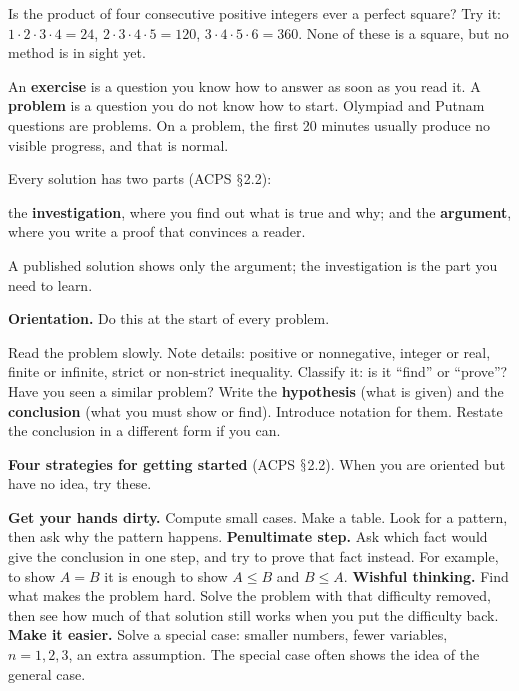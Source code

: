 \documentclass[10pt]{scrartcl}
\renewcommand{\S}{\ensuremath{\mathsection}}
\begin{document}
\begin{qbox}
  Is the product of four consecutive positive integers ever a perfect square? Try it: $1\cdot2\cdot3\cdot4 = 24$, $2\cdot3\cdot4\cdot5 = 120$, $3\cdot4\cdot5\cdot6 = 360$. None of these is a square, but no method is in sight yet.
\end{qbox}

An \textbf{exercise} is a question you know how to answer as soon as you read it. A \textbf{problem} is a question you do not know how to start. Olympiad and Putnam questions are problems. On a problem, the first 20 minutes usually produce no visible progress, and that is normal.

Every solution has two parts (ACPS \S2.2):
\begin{itemize}
  \ii the \textbf{investigation}, where you find out what is true and why; and
  \ii the \textbf{argument}, where you write a proof that convinces a reader.
\end{itemize}
A published solution shows only the argument; the investigation is the part you need to learn.

\noindent\textbf{Orientation.} Do this at the start of every problem.
\begin{enumerate}
  \ii Read the problem slowly. Note details: positive or nonnegative, integer or real, finite or infinite, strict or non-strict inequality.
  \ii Classify it: is it ``find'' or ``prove''? Have you seen a similar problem?
  \ii Write the \textbf{hypothesis} (what is given) and the \textbf{conclusion} (what you must show or find). Introduce notation for them.
  \ii Restate the conclusion in a different form if you can.
\end{enumerate}

\noindent\textbf{Four strategies for getting started} (ACPS \S2.2). When you are oriented but have no idea, try these.
\begin{itemize}
  \ii \textbf{Get your hands dirty.} Compute small cases. Make a table. Look for a pattern, then ask why the pattern happens.
  \ii \textbf{Penultimate step.} Ask which fact would give the conclusion in one step, and try to prove that fact instead. For example, to show $A = B$ it is enough to show $A \le B$ and $B \le A$.
  \ii \textbf{Wishful thinking.} Find what makes the problem hard. Solve the problem with that difficulty removed, then see how much of that solution still works when you put the difficulty back.
  \ii \textbf{Make it easier.} Solve a special case: smaller numbers, fewer variables, $n = 1, 2, 3$, an extra assumption. The special case often shows the idea of the general case.
\end{itemize}
\end{document}

